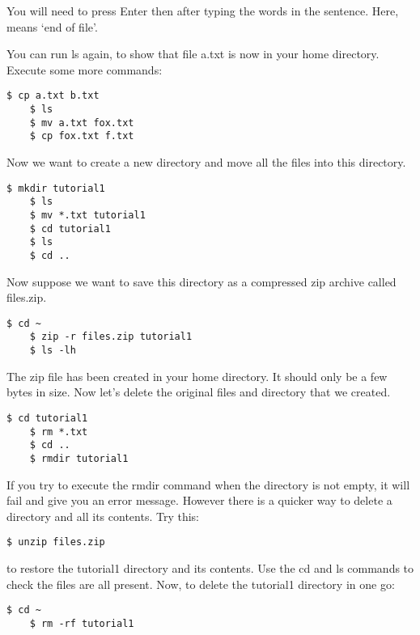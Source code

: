 \documentclass{article}
\begin{document}
You will need to press Enter then  after typing the words in the sentence. Here,  means `end of file'.

You can run ls again, to show that file a.txt is now in your home directory. Execute some more commands:

\begin{lstlisting}[style=BashInputStyle]
    $ cp a.txt b.txt
    $ ls
    $ mv a.txt fox.txt
    $ cp fox.txt f.txt
\end{lstlisting}

Now we want to create a new directory and move all the files into this directory.

\begin{lstlisting}[style=BashInputStyle]
    $ mkdir tutorial1
    $ ls
    $ mv *.txt tutorial1
    $ cd tutorial1
    $ ls
    $ cd ..
\end{lstlisting}

Now suppose we want to save this directory as a compressed zip archive called files.zip.

\begin{lstlisting}[style=BashInputStyle]
    $ cd ~
    $ zip -r files.zip tutorial1 
    $ ls -lh    
\end{lstlisting}

The zip file has been created in your home directory. It should only be a few bytes in size. Now let's delete the original files and directory that we created.

\begin{lstlisting}[style=BashInputStyle]
    $ cd tutorial1
    $ rm *.txt
    $ cd ..
    $ rmdir tutorial1  
\end{lstlisting}


If you try to execute the rmdir command when the directory is not empty, it will fail and give you an error message. However there is a quicker way to delete a directory and all its contents. Try this:

\begin{lstlisting}[style=BashInputStyle]
    $ unzip files.zip
\end{lstlisting}

to restore the tutorial1 directory and its contents. Use the cd and ls commands to check the files are all present. Now, to delete the tutorial1 directory in one go:

\begin{lstlisting}[style=BashInputStyle]
    $ cd ~
    $ rm -rf tutorial1
\end{lstlisting}
\end{document}
